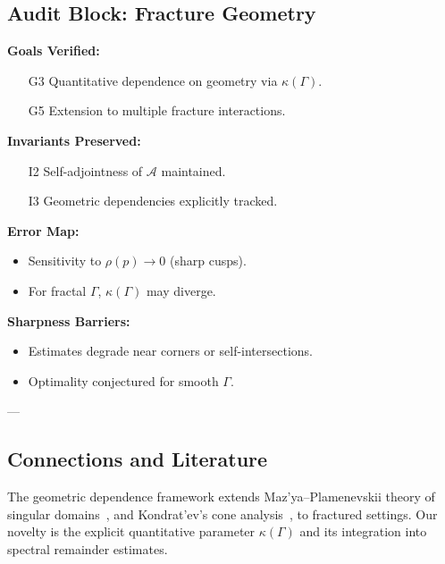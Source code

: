 \subsection{Audit Block: Fracture Geometry}

\begin{auditblock}
\textbf{Goals Verified:}
\begin{itemize}
  \item[G3] Quantitative dependence on geometry via $\kappa(\Gamma)$.
  \item[G5] Extension to multiple fracture interactions.
\end{itemize}

\textbf{Invariants Preserved:}
\begin{itemize}
  \item[I2] Self-adjointness of $\mathcal{A}$ maintained.
  \item[I3] Geometric dependencies explicitly tracked.
\end{itemize}

\textbf{Error Map:}
\begin{itemize}
  \item Sensitivity to $\rho(p) \to 0$ (sharp cusps).
  \item For fractal $\Gamma$, $\kappa(\Gamma)$ may diverge.
\end{itemize}

\textbf{Sharpness Barriers:}
\begin{itemize}
  \item Estimates degrade near corners or self-intersections.
  \item Optimality conjectured for smooth $\Gamma$.
\end{itemize}
\end{auditblock}

---

\subsection*{Connections and Literature}

The geometric dependence framework extends  
Maz’ya–Plamenevskii theory of singular domains~\cite{MazyaPlamenevskii1980},  
and Kondrat’ev’s cone analysis~\cite{Kondratev1967},  
to fractured settings.  
Our novelty is the explicit quantitative parameter $\kappa(\Gamma)$ 
and its integration into spectral remainder estimates.


